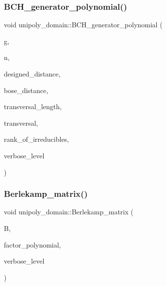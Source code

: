 \subsubsection{\texorpdfstring{B\+C\+H\+\_\+generator\+\_\+polynomial()}{BCH\_generator\_polynomial()}}
{\footnotesize\ttfamily void unipoly\+\_\+domain\+::\+B\+C\+H\+\_\+generator\+\_\+polynomial (\begin{DoxyParamCaption}\item[{\mbox{\hyperlink{galois_8h_a77ca58de3d2da6172242493dd9c8aaa8}{unipoly\+\_\+object}} \&}]{g,  }\item[{\mbox{\hyperlink{galois_8h_a09fddde158a3a20bd2dcadb609de11dc}{I\+NT}}}]{n,  }\item[{\mbox{\hyperlink{galois_8h_a09fddde158a3a20bd2dcadb609de11dc}{I\+NT}}}]{designed\+\_\+distance,  }\item[{\mbox{\hyperlink{galois_8h_a09fddde158a3a20bd2dcadb609de11dc}{I\+NT}} \&}]{bose\+\_\+distance,  }\item[{\mbox{\hyperlink{galois_8h_a09fddde158a3a20bd2dcadb609de11dc}{I\+NT}} \&}]{transversal\+\_\+length,  }\item[{\mbox{\hyperlink{galois_8h_a09fddde158a3a20bd2dcadb609de11dc}{I\+NT}} $\ast$\&}]{transversal,  }\item[{\mbox{\hyperlink{classlonginteger__object}{longinteger\+\_\+object}} $\ast$\&}]{rank\+\_\+of\+\_\+irreducibles,  }\item[{\mbox{\hyperlink{galois_8h_a09fddde158a3a20bd2dcadb609de11dc}{I\+NT}}}]{verbose\+\_\+level }\end{DoxyParamCaption})}

\mbox{\label{classunipoly__domain_a560f4cc73e0badeba359203643fbc333}} 
\subsubsection{\texorpdfstring{Berlekamp\+\_\+matrix()}{Berlekamp\_matrix()}}
{\footnotesize\ttfamily void unipoly\+\_\+domain\+::\+Berlekamp\+\_\+matrix (\begin{DoxyParamCaption}\item[{\mbox{\hyperlink{galois_8h_a09fddde158a3a20bd2dcadb609de11dc}{I\+NT}} $\ast$\&}]{B,  }\item[{\mbox{\hyperlink{galois_8h_a77ca58de3d2da6172242493dd9c8aaa8}{unipoly\+\_\+object}}}]{factor\+\_\+polynomial,  }\item[{\mbox{\hyperlink{galois_8h_a09fddde158a3a20bd2dcadb609de11dc}{I\+NT}}}]{verbose\+\_\+level }\end{DoxyParamCaption})}

